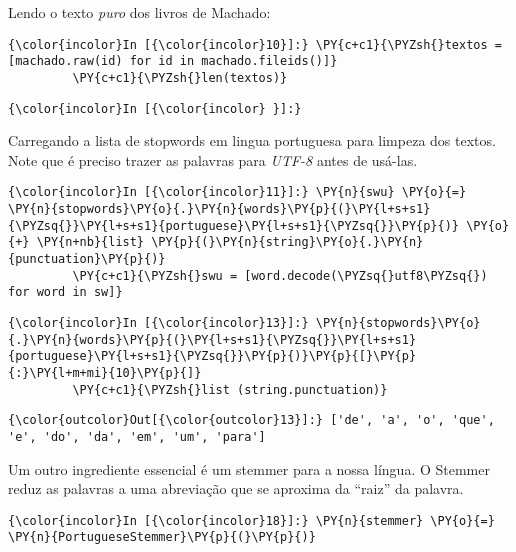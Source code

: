     Lendo o texto \emph{puro} dos livros de Machado:

    \begin{Verbatim}[commandchars=\\\{\}]
{\color{incolor}In [{\color{incolor}10}]:} \PY{c+c1}{\PYZsh{}textos = [machado.raw(id) for id in machado.fileids()]}
         \PY{c+c1}{\PYZsh{}len(textos)}
\end{Verbatim}

    \begin{Verbatim}[commandchars=\\\{\}]
{\color{incolor}In [{\color{incolor} }]:} 
\end{Verbatim}

    Carregando a lista de stopwords em lingua portuguesa para limpeza dos
textos. Note que é preciso trazer as palavras para \emph{UTF-8} antes de
usá-las.

    \begin{Verbatim}[commandchars=\\\{\}]
{\color{incolor}In [{\color{incolor}11}]:} \PY{n}{swu} \PY{o}{=} \PY{n}{stopwords}\PY{o}{.}\PY{n}{words}\PY{p}{(}\PY{l+s+s1}{\PYZsq{}}\PY{l+s+s1}{portuguese}\PY{l+s+s1}{\PYZsq{}}\PY{p}{)} \PY{o}{+} \PY{n+nb}{list} \PY{p}{(}\PY{n}{string}\PY{o}{.}\PY{n}{punctuation}\PY{p}{)}
         \PY{c+c1}{\PYZsh{}swu = [word.decode(\PYZsq{}utf8\PYZsq{}) for word in sw]}
\end{Verbatim}

    \begin{Verbatim}[commandchars=\\\{\}]
{\color{incolor}In [{\color{incolor}13}]:} \PY{n}{stopwords}\PY{o}{.}\PY{n}{words}\PY{p}{(}\PY{l+s+s1}{\PYZsq{}}\PY{l+s+s1}{portuguese}\PY{l+s+s1}{\PYZsq{}}\PY{p}{)}\PY{p}{[}\PY{p}{:}\PY{l+m+mi}{10}\PY{p}{]}
         \PY{c+c1}{\PYZsh{}list (string.punctuation)}
\end{Verbatim}

            \begin{Verbatim}[commandchars=\\\{\}]
{\color{outcolor}Out[{\color{outcolor}13}]:} ['de', 'a', 'o', 'que', 'e', 'do', 'da', 'em', 'um', 'para']
\end{Verbatim}
        
    Um outro ingrediente essencial é um stemmer para a nossa língua. O
Stemmer reduz as palavras a uma abreviação que se aproxima da ``raiz''
da palavra.

    \begin{Verbatim}[commandchars=\\\{\}]
{\color{incolor}In [{\color{incolor}18}]:} \PY{n}{stemmer} \PY{o}{=} \PY{n}{PortugueseStemmer}\PY{p}{(}\PY{p}{)}
\end{Verbatim}

